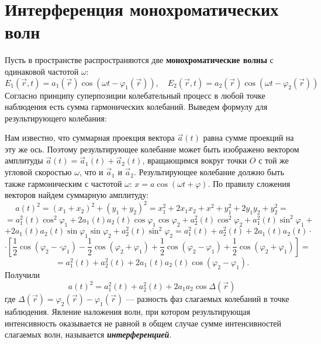 \documentclass[a4paper, 12pt]{book}
\begin{document}
	\section{Интерференция монохроматических волн}
	Пусть в пространстве распространяются две \textbf{монохроматические волны} с одинаковой частотой $\omega$:
	\begin{equation*}
		E_1\left(\vec{r},t\right)=a_1\left(\vec{r}\right)\cos\left(\omega t-\varphi_1\left(\vec{r}\right)\right),\quad E_2\left(\vec{r},t\right)=a_2\left(\vec{r}\right)\cos\left(\omega t-\varphi_2\left(\vec{r}\right)\right)
	\end{equation*}
	Согласно принципу суперпозиции колебательный процесс в любой точке наблюдения есть сумма гармонических колебаний. Выведем формулу для результирующего колебания:\par
	Нам известно, что суммарная проекция вектора $\vec{a}\left(t\right)$ равна сумме проекций на эту же ось. Поэтому результирующее колебание может быть изображено вектором амплитуды $\vec{a}\left(t\right)=\vec{a}_1\left(t\right)+\vec{a}_2\left(t\right)$, вращающимся вокруг точки $O$ с той же угловой скоростью $\omega$, что и $\vec{a}_1$ и $\vec{a}_2$. Результирующее колебание должно быть также гармоническим с частотой $\omega$: $x=a\cos\left(\omega t+\varphi\right)$. По правилу сложения векторов найдем суммарную амплитуду:\\
	\begin{equation*}
		a\left(t\right)^2=\left(x_1+x_2\right)^2+\left(y_1+y_2\right)^2=x_1^2+2x_1x_2+x^2+y_1^2+2y_1y_2+y_2^2=
	\end{equation*}
	\begin{equation*}
		=a^2_1\left(t\right)\cos^2{\varphi_1}+2a_1\left(t\right)a_2\left(t\right)\cos{\varphi_1}\cos{\varphi_2}+a^2_2\left(t\right)\cos^2{\varphi_2}+a_1^2\left(t\right)\sin^2{\varphi_1}+
	\end{equation*}
	\begin{equation*}+2a_1\left(t\right)a_2\left(t\right)\sin{\varphi_1}\sin{\varphi_2}+a_2^2\left(t\right)\sin^2{\varphi_2}=a_1^2\left(t\right)+a_2^2\left(t\right)+2a_1\left(t\right)a_2\left(t\right)\cdot	
	\end{equation*}
	\begin{equation*}
	\cdot\left[\frac{1}{2}\cos\left(\varphi_2-\cdot\varphi_1\right)-\frac{1}{2}\cos\left(\varphi_2+\varphi_1\right)+\frac{1}{2}\cos\left(\varphi_2-\varphi_1\right)+\frac{1}{2}\cos\left(\varphi_2+\varphi_1\right)\right]=
	\end{equation*}
	\begin{equation*}
		=a_1^2\left(t\right)+a_2^2\left(t\right)+2a_1\left(t\right)a_2\left(t\right)\cos\left(\varphi_2-\varphi_1\right).
	\end{equation*}	
	Получили
	\begin{equation}
		a\left(t\right)^2=a_1^2\left(t\right)+a_2^2\left(t\right)+2a_1a_2\cos\Delta\left(\vec{r}\right)
	\end{equation}
	где $\Delta\left(\vec{r}\right)=\varphi_2\left(\vec{r}\right)-\varphi_1\left(\vec{r}\right)$ — разность фаз слагаемых колебаний в точке наблюдения. Явление наложения волн, при котором результирующая интенсивность оказывается не равной в общем случае сумме интенсивностей слагаемых волн, называется \textit{\textbf{интерференцией}}.
\end{document}
